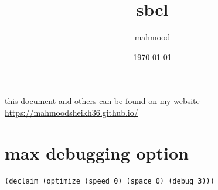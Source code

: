 \documentclass[a4paper,12pt]{article}
\author{mahmood}
\date{\today}
\title{sbcl}
\begin{document}
\maketitle
\begin{note}
this document and others can be found on my website\\
\url{https://mahmoodsheikh36.github.io/}
\end{note}
\section{max debugging option}
\label{sec:org654bdaa}
\lstset{language=Lisp,label= ,caption= ,captionpos=b,numbers=none}
\begin{lstlisting}
(declaim (optimize (speed 0) (space 0) (debug 3)))
\end{lstlisting}
\end{document}
